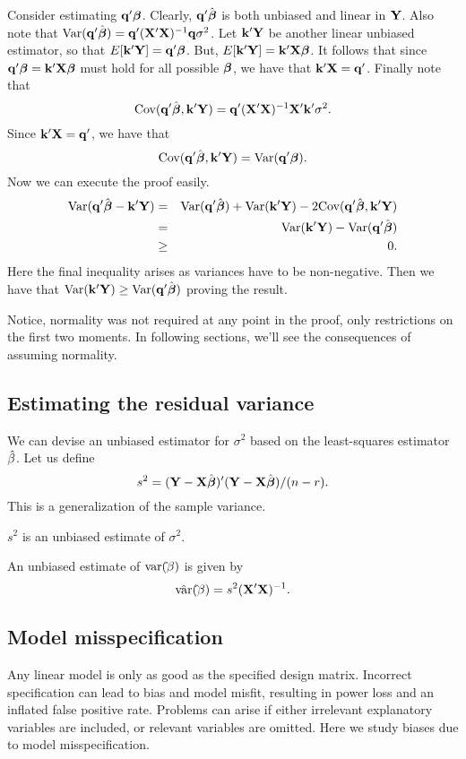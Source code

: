  Consider estimating $\mathbf{q}' \boldsymbol{\beta}$.
Clearly, $\mathbf{q}' \hat {\boldsymbol{\beta}}$ is both unbiased and linear in $\mathbf{Y}$. 
Also note that $\mbox{Var}(\mathbf{q}' \hat {\boldsymbol{\beta}}) = \mathbf{q}' (\mathbf{X}' \mathbf{X})^{-1} \mathbf{q} \sigma^2$. 
Let $\mathbf{k}' \mathbf{Y}$ be another linear unbiased estimator, so that
$E[\mathbf{k}' \mathbf{Y}] = \mathbf{q}' \boldsymbol{\beta}$. But, $E[\mathbf{k}' \mathbf{Y}] = \mathbf{k}' \mathbf{X} \boldsymbol{\beta}$. 
It follows that since  $\mathbf{q}' \boldsymbol{\beta} = \mathbf{k}' \mathbf{X} \boldsymbol{\beta}$ must hold for all possible $\boldsymbol{\beta}$, we have that
$\mathbf{k}' \mathbf{X} = \mathbf{q}'$. Finally note that
$$
\mbox{Cov}(\mathbf{q}' \hat {\boldsymbol{\beta}}, \mathbf{k}' \mathbf{Y})
= \mathbf{q}' (\mathbf{X'} \mathbf{X})^{-1} \mathbf{X}' \mathbf{k}' \sigma^2.
$$
Since $\mathbf{k}' \mathbf{X} = \mathbf{q}'$, we have that
$$
\mbox{Cov}(\mathbf{q}' \hat {\boldsymbol{\beta}}, \mathbf{k}' \mathbf{Y}) = \mbox{Var}(\mathbf{q}' \boldsymbol{\beta}).
$$
Now we can execute the proof easily. 
\begin{eqnarray*}
\mbox{Var}(\mathbf{q}' \hat {\boldsymbol{\beta}} - \mathbf{k}' \mathbf{Y}) & = & 
\mbox{Var}(\mathbf{q}' \hat {\boldsymbol{\beta}}) + \mbox{Var}(\mathbf{k}' \mathbf{Y}) - 2 \mbox{Cov}(\mathbf{q}' \hat {\boldsymbol{\beta}}, \mathbf{k}' \mathbf{Y}) \\
& = & \mbox{Var}(\mathbf{k}' \mathbf{Y}) - \mbox{Var}(\mathbf{q}' \hat {\boldsymbol{\beta}}) \\ 
& \geq & 0.
\end{eqnarray*}
Here the final inequality arises as variances have to be non-negative. Then we have
that $\mbox{Var}(\mathbf{k}' \mathbf{Y}) \geq \mbox{Var}(\mathbf{q}' \hat {\boldsymbol{\beta}})$ proving the result.

Notice, normality was not required at any point in the proof, only restrictions
on the first two moments. In following sections, we'll see the consequences of
assuming normality.


\subsection{Estimating the residual variance}

We can devise an unbiased estimator for $\sigma^2$ based on the least-squares estimator $\hat{\bf \beta}$. 
Let us define 
$$s^2 = (\mathbf{Y}-\mathbf{X}\hat{\mbox{\boldmath $\beta$}})'(\mathbf{Y}-\mathbf{X}\hat{\mbox{\boldmath $\beta$}})/(n-r).$$
This is a generalization of the sample variance.


\bstheo
$s^2$ is an unbiased estimate of $\sigma^2$.
\etheo


\bstheo
An unbiased estimate of $\mathrm{var}({\hat \bf \beta})$ is given by
$$
\hat {\mathrm{var}}({\hat \bf \beta}) = s^2 (\mathbf{X}' \mathbf{X})^{-1}.
$$
\etheo



\subsection{Model misspecification}

Any linear model is only as good as the specified design matrix.  Incorrect specification can lead to bias and model misfit, resulting in power loss and an inflated false positive rate.  Problems can arise if either irrelevant explanatory variables are included, or relevant variables are omitted. Here we study biases due to model misspecification.

